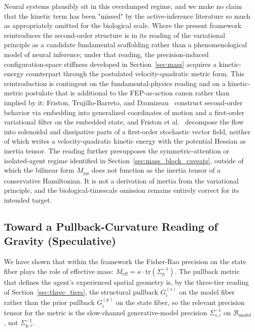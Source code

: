 \documentclass[11pt]{article}
\begin{document}
Neural systems plausibly sit in this overdamped regime, and we make no claim that the kinetic term has been "missed" by the active-inference literature so much as appropriately omitted for the biological scale. Where the present framework reintroduces the second-order structure is in its reading of the variational principle as a candidate fundamental scaffolding rather than a phenomenological model of neural inference; under that reading, the precision-induced configuration-space stiffness developed in Section~\ref{sec:mass} acquires a kinetic-energy counterpart through the postulated velocity-quadratic metric form. This reintroduction is contingent on the fundamental-physics reading and on a kinetic-metric postulate that is additional to the FEP-as-action canon rather than implied by it: Friston, Trujillo-Barreto, and Daunizeau~\cite{Friston2008DEM} construct second-order behavior via embedding into generalized coordinates of motion and a first-order variational filter on the embedded state, and Friston et al.~\cite{Friston2023PhysReports} decompose the flow into solenoidal and dissipative parts of a first-order stochastic vector field, neither of which writes a velocity-quadratic kinetic energy with the potential Hessian as inertia tensor. The reading further presupposes the symmetric-attention or isolated-agent regime identified in Section~\ref{sec:mass_block_caveats}, outside of which the bilinear form $M_{\mu\mu}$ does not function as the inertia tensor of a conservative Hamiltonian. It is not a derivation of inertia from the variational principle, and the biological-timescale omission remains entirely correct for its intended target.

\subsection{Toward a Pullback-Curvature Reading of Gravity (Speculative)}
\label{sec:gravity_pullback}

We have shown that within the framework the Fisher-Rao precision on the state fiber plays the role of effective mass: $M_{\text{eff}} = \kappa \cdot \mathrm{tr}(\Sigma_p^{-1})$. The pullback metric that defines the agent's experienced spatial geometry is, by the three-tier reading of Section~\ref{sec:three_tiers}, the structural pullback $G_i^{(s)}$ on the model fiber rather than the prior pullback $G_i^{(p)}$ on the state fiber, so the relevant precision tensor for the metric is the slow-channel generative-model precision $\Sigma_{s,i}^{-1}$ on $\mathcal{B}_{\mathrm{model}}$, not $\Sigma_{p,i}^{-1}$.
\end{document}

